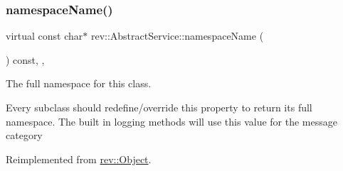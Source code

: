 \mbox{\label{classrev_1_1_abstract_service_a062e932eaa2eab0109288f2b32e459f7}} 
\subsubsection{\texorpdfstring{namespaceName()}{namespaceName()}}
{\footnotesize\ttfamily virtual const char$\ast$ rev\+::\+Abstract\+Service\+::namespace\+Name (\begin{DoxyParamCaption}{ }\end{DoxyParamCaption}) const\hspace{0.3cm}{\ttfamily [inline]}, {\ttfamily [override]}, {\ttfamily [virtual]}}



The full namespace for this class. 

Every subclass should redefine/override this property to return its full namespace. The built in logging methods will use this value for the message category 

Reimplemented from \mbox{\hyperlink{classrev_1_1_object_aaeb638d3e10f361c56c211a318a27f3d}{rev\+::\+Object}}.



